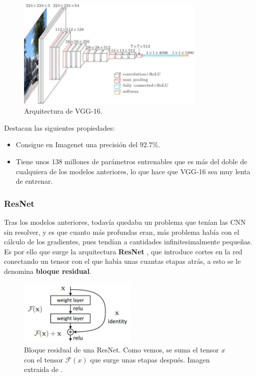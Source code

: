         \begin{figure}[!h]
            \centering
            \includegraphics[width=0.8\textwidth]{img/VGG-16.jpeg}
            \caption{Arquitectura de VGG-16.}
            \label{fig:VGG}
        \end{figure}

        \noindent Destacan las siguientes propiedades:

        \begin{itemize}
            \item Consigue en Imagenet una precisión del $92.7 \%$.
            \item Tiene unos 138 millones de parámetros entrenables que es más del doble de cualquiera de los modelos anteriores, lo que hace que VGG-16 sea muy lenta de entrenar.
        \end{itemize}

    \subsubsection{ResNet}

        \noindent Tras los modelos anteriores, todavía quedaba un problema que tenían las CNN sin resolver, y es que cuanto más profundas eran, más problema había con el cálculo de los gradientes, pues tendían a cantidades infinitesimalmente pequeñas. Es por ello que surge la arquitectura \textbf{ResNet} \cite{he2016deep}, que introduce cortes en la red conectando un tensor con el que había unas cuantas etapas atrás, a esto se le denomina \textbf{bloque residual}. 

        \begin{figure}[!h]
            \centering
            \includegraphics[width=0.5\textwidth]{img/resnet_module.jpeg}
            \caption{Bloque residual de una ResNet. Como vemos, se suma el tensor $x$ con el tensor $\mathcal{F}(x)$ que surge unas etapas después. Imagen extraida de \cite{he2016deep}.}
            \label{fig:Resnet}
        \end{figure}
        
